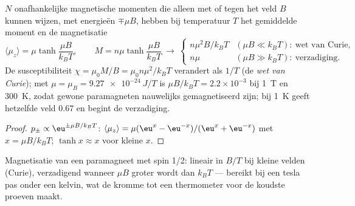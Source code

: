 \begin{proposition}\label{prop:b2:boltzmann-factor:curie}
$N$ onafhankelijke magnetische momenten die alleen met of tegen
het veld $B$ kunnen wijzen, met energieën $\mp\mu B$, hebben bij temperatuur
$T$ het gemiddelde
moment en de magnetisatie
\[
\langle\mu_z\rangle = \mu\tanh\frac{\mu B}{k_BT}, \qquad
M = n\mu\tanh\frac{\mu B}{k_BT}
\ \longrightarrow\
\begin{cases} n\mu^2B/k_BT & (\mu B \ll k_BT):\ \text{wet van Curie}, \\ n\mu & (\mu B \gg k_BT):\ \text{verzadiging}. \end{cases}
\]
De susceptibiliteit $\chi = \mu_0M/B = \mu_0n\mu^2/k_BT$ verandert als $1/T$
(de \emph{wet van Curie}\index{wet van Curie}); met
$\mu = \mu_B = \qty{9.27e-24}{J/T}$
is $\mu B/k_BT = 2.2 \times 10^{-3}$ bij \qty{1}{T} en \qty{300}{K}, zodat gewone
paramagneten nauwelijks gemagnetiseerd zijn; bij \qty{1}{K} geeft hetzelfde veld
$0.67$ en begint de verzadiging.
\end{proposition}

\begin{proof}
$p_\pm \propto\eu^{\pm\mu B/k_BT}$:
$\langle\mu_z\rangle = \mu(\eu^x - \eu^{-x})/(\eu^x +
\eu^{-x})$ met
$x = \mu B/k_BT$; $\tanh x \approx x$ voor kleine $x$.
\end{proof}

\begin{omfigure}

{\small Magnetisatie van een paramagneet met spin 1/2: lineair in $B/T$ bij
kleine velden (Curie), verzadigend wanneer $\mu B$ groter wordt dan $k_BT$
--- bereikt
bij een tesla pas onder een kelvin, wat de kromme tot een thermometer
voor de koudste proeven maakt.}
\end{omfigure}

